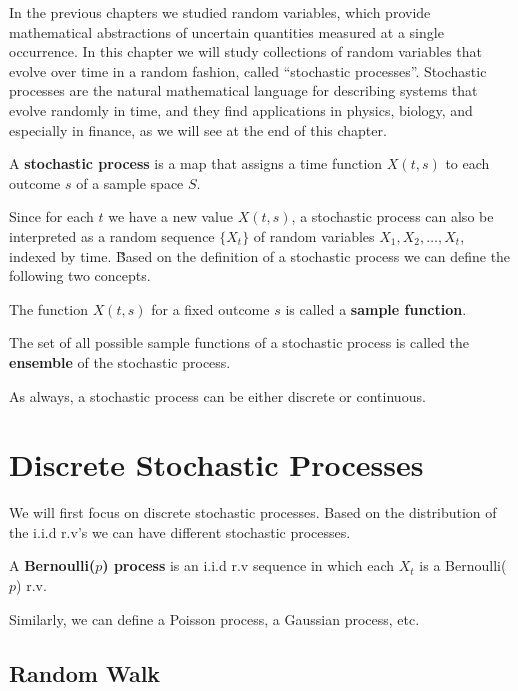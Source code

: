 In the previous chapters we studied random variables, which provide mathematical abstractions of uncertain quantities
measured at a single occurrence. In this chapter we will study collections of random variables that evolve over time
in a random fashion, called ``stochastic processes''. Stochastic processes are the natural mathematical language for
describing systems that evolve randomly in time, and they find applications in physics, biology, and especially in
finance, as we will see at the end of this chapter.

A \textbf{stochastic process} is a map that assigns a time function $X(t,s)$ to each outcome $s$ of a sample space
$S$.
\ed


Since for each $t$ we have a new value $X(t,s)$, a stochastic process can also be interpreted as a random sequence
$\{ X_{t} \}$ of random variables $X_{1}, X_{2}, \ldots, X_{t}$, indexed by time. \v

Based on the definition of a stochastic process we can define the following two concepts.

The function $X(t,s)$ for a fixed outcome $s$ is called a \textbf{sample function}.
\ed

\bd[Ensemble]
The set of all possible sample functions of a stochastic process is called the \textbf{ensemble} of the stochastic
process.
\ed

As always, a stochastic process can be either discrete or continuous.


\section{Discrete Stochastic Processes}

We will first focus on discrete stochastic processes. Based on the distribution of the i.i.d r.v's we can have
different stochastic processes.

A \textbf{Bernoulli($p$) process} is an i.i.d r.v sequence in which each $X_{t}$ is a Bernoulli($p$) r.v.
\ed

Similarly, we can define a Poisson process, a Gaussian process, etc.

\subsection{Random Walk}

